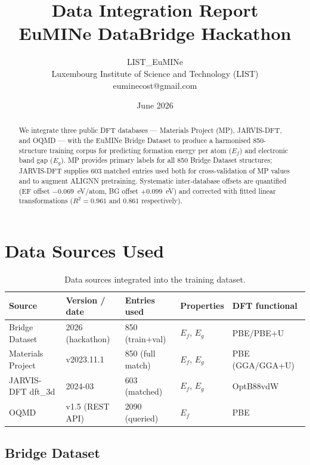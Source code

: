 \documentclass[10pt, a4paper]{article}
\title{%
  \textbf{Data Integration Report}\\[4pt]
  {\large EuMINe DataBridge Hackathon \hackathonyear}
}
\author{
  LIST\_EuMINe \\
  \small Luxembourg Institute of Science and Technology (LIST) \\
  \small euminecost@gmail.com
}
\date{June 2026}
\begin{document}
\maketitle
\thispagestyle{fancy}

\begin{abstract}
We integrate three public DFT databases — Materials Project (MP),
JARVIS-DFT, and OQMD — with the EuMINe Bridge Dataset to produce
a harmonised 850-structure training corpus for predicting formation
energy per atom ($E_f$) and electronic band gap ($E_g$).
MP provides primary labels for all 850 Bridge Dataset structures;
JARVIS-DFT supplies 603 matched entries used both for cross-validation
of MP values and to augment ALIGNN pretraining.
Systematic inter-database offsets are quantified (EF offset
$-0.069$~eV/atom, BG offset $+0.099$~eV) and corrected with fitted
linear transformations ($R^2 = 0.961$ and $0.861$ respectively).
\end{abstract}

\tableofcontents
\vspace{1em}

\section{Data Sources Used}

\begin{table}[h!]
\centering
\caption{Data sources integrated into the training dataset.}
\label{tab:sources}
\begin{tabular}{@{}lllll@{}}
\toprule
Source & Version / date & Entries used & Properties & DFT functional \\
\midrule
Bridge Dataset    & 2026 (hackathon) & 850 (train+val) & $E_f$, $E_g$ & PBE/PBE+U \\
Materials Project & v2023.11.1       & 850 (full match) & $E_f$, $E_g$ & PBE (GGA/GGA+U) \\
JARVIS-DFT dft\_3d & 2024-03         & 603 (matched)    & $E_f$, $E_g$ & OptB88vdW \\
OQMD              & v1.5 (REST API)  & 2090 (queried)   & $E_f$        & PBE \\
\bottomrule
\end{tabular}
\end{table}

\subsection{Bridge Dataset}
\end{document}
